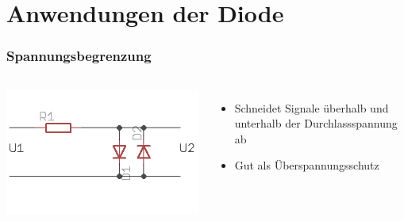 \section*{Anwendungen der Diode}

\begin{frame}
    \frametitle{Spannungsbegrenzung}
    \begin{columns}[c]
        \column[c]{5cm}
        \begin{center}
            \includegraphics[width=1\textwidth]{a05/spannungsBegrenz.png}\\
            \tiny \hyperlink{refs}{\cite{wm}}
        \end{center}
        \column{5cm}
    \begin{itemize}
			\item Schneidet Signale überhalb und unterhalb der Durchlassspannung ab
			\item Gut als Überspannungsschutz
    \end{itemize}
    \end{columns}
\end{frame}



